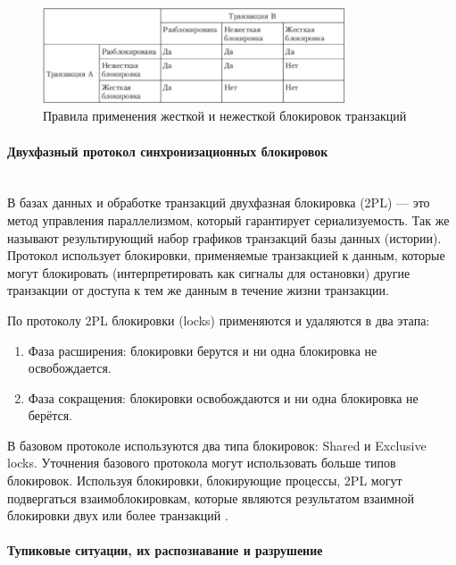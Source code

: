 \begin{figure}[h!]
    \centering
    \includegraphics[width=0.8\textwidth]{assets/blocks.PNG}
    \caption{Правила применения жесткой и нежесткой блокировок транзакций}
\end{figure}


\paragraph{Двухфазный протокол синхронизационных блокировок}~\\

В базах данных и обработке транзакций двухфазная блокировка (2PL) — это метод управления параллелизмом, который гарантирует сериализуемость. Так же называют результирующий набор графиков транзакций базы данных (истории). Протокол использует блокировки, применяемые транзакцией к данным, которые могут блокировать (интерпретировать как сигналы для остановки) другие транзакции от доступа к тем же данным в течение жизни транзакции.


По протоколу 2PL блокировки (locks) применяются и удаляются в два этапа:

\begin{enumerate}
    \item Фаза расширения: блокировки берутся и ни одна блокировка не освобождается.
    \item Фаза сокращения: блокировки освобождаются и ни одна блокировка не берётся.
\end{enumerate}

В базовом протоколе используются два типа блокировок: Shared и Exclusive locks. Уточнения базового протокола могут использовать больше типов блокировок. Используя блокировки, блокирующие процессы, 2PL могут подвергаться взаимоблокировкам, которые являются результатом взаимной блокировки двух или более транзакций \autocite{Wiki}.

\paragraph{Тупиковые ситуации, их распознавание и разрушение} ~\\

